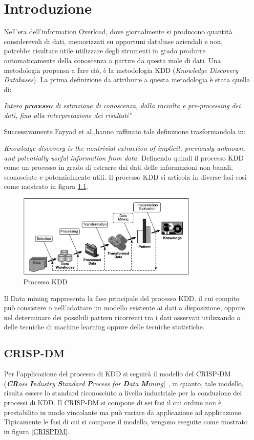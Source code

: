 \chapter{Introduzione}
Nell'era dell'information Overload, dove giornalmente si producono quantità considerevoli di dati, memorizzati su opportuni database aziendali e non, potrebbe risultare utile utilizzare degli strumenti in grado produrre automaticamente della conoscenza a partire da questa mole di dati. Una metodologia propensa a fare ciò, è la metodologia KDD (\emph{Knowledge Discovery Databases}). 
La prima definizione da attribuire a questa metodologia è stata quella di:

\emph{Intero \textbf{processo} di estrazione di conoscenza, dalla raccolta e pre-processing dei dati, fino alla interpretazione dei risultati"\cite{DBLP:conf/kdd/1995}}


Successivamente Fayyad et al.,hanno raffinato tale definizione trasformandola in: 

\emph{Knowledge discovery is the nontrivial extraction of implicit, previously unknown, and potentially useful information from data.}
\cite{citeulike:1550195} Definendo quindi il processo KDD come un processo in grado di estrarre dai dati delle informazioni non banali, sconosciute e potenzialmente utili. Il processo KDD si articola in diverse fasi cosi come mostrato in figura \ref{kddprocess}.

\begin{figure}[hbtp]
\centering
\includegraphics[width=0.8\textwidth]{./images/kddprocess.png}
\caption{Processo KDD}
\label{kddprocess}
\end{figure}

Il Data mining rappresenta la fase principale del processo KDD, il cui compito può consistere o nell'adattare un modello esistente ai dati a disposizione, oppure nel determinare dei possibili pattern ricorrenti tra i dati osservati utilizzando o delle tecniche di machine learning oppure delle tecniche statistiche. 

\section{CRISP-DM}
Per l'applicazione del processo di KDD si seguirà il modello del CRISP-DM (\emph{\textbf{CR}oss \textbf{I}ndustry \textbf{S}tandard \textbf{P}rocess for \textbf{D}ata \textbf{M}ining})
\cite{wirth2000crisp}
, in quanto, tale modello, risulta essere lo standard riconosciuto a livello industriale per la conduzione dei processi di KDD.
Il CRISP-DM si compone di sei fasi il cui ordine non è prestabilito in modo vincolante ma può variare da applicazione ad applicazione. Tipicamente le fasi di cui si compone il modello, vengono eseguite come mostrato in figura \ref{CRISPDM}.

